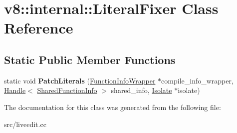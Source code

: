 \hypertarget{classv8_1_1internal_1_1_literal_fixer}{}\section{v8\+:\+:internal\+:\+:Literal\+Fixer Class Reference}
\label{classv8_1_1internal_1_1_literal_fixer}
\subsection*{Static Public Member Functions}
\begin{DoxyCompactItemize}
\item 
\hypertarget{classv8_1_1internal_1_1_literal_fixer_a9b8eb530fe146671213398028383a6de}{}static void {\bfseries Patch\+Literals} (\hyperlink{classv8_1_1internal_1_1_function_info_wrapper}{Function\+Info\+Wrapper} $\ast$compile\+\_\+info\+\_\+wrapper, \hyperlink{classv8_1_1internal_1_1_handle}{Handle}$<$ \hyperlink{classv8_1_1internal_1_1_shared_function_info}{Shared\+Function\+Info} $>$ shared\+\_\+info, \hyperlink{classv8_1_1internal_1_1_isolate}{Isolate} $\ast$isolate)\label{classv8_1_1internal_1_1_literal_fixer_a9b8eb530fe146671213398028383a6de}

\end{DoxyCompactItemize}


The documentation for this class was generated from the following file\+:\begin{DoxyCompactItemize}
\item 
src/liveedit.\+cc\end{DoxyCompactItemize}
